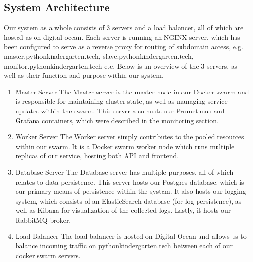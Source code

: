 \begin{itemize}
\begin{enumerate}
  \end{enumerate}

  \subsection{System Architecture}
  Our system as a whole consists of 3 servers and a load balancer, all of which are hosted as on digital ocean.
  Each server is running an NGINX server, which has been configured to serve as a reverse proxy for routing of subdomain access, e.g. master.pythonkindergarten.tech, slave.pythonkindergarten.tech, monitor.pythonkindergarten.tech etc.
  \newline
  Below is an overview of the 3 servers, as well as their function and purpose within our system.\newline
  
  \begin{enumerate}
    \item Master Server\newline
    The Master server is the master node in our Docker swarm and is responsible for maintaining cluster state, as well as managing service updates within the swarm.
    This server also hosts our Prometheus and Grafana containers, which were described in the monitoring section.
    \item Worker Server\newline
    The Worker server simply contributes to the pooled resources within our swarm. 
    It is a Docker swarm worker node which runs multiple replicas of our service, hosting both API and frontend.

    \item Database Server\newline
    The Database server has multiple purposes, all of which relates to data persistence.
    This server hosts our Postgres database, which is our primary means of persistence within the system. 
    \newline
    It also hosts our logging system, which consists of an ElasticSearch database (for log persistence), as well as Kibana for visualization of the collected logs.
    \newline
    Lastly, it hosts our RabbitMQ broker.
    \item Load Balancer\newline
    The load balancer is hosted on Digital Ocean and allows us to balance incoming traffic on pythonkindergarten.tech between each of our docker swarm servers.
  \end{enumerate}


\end{itemize}

